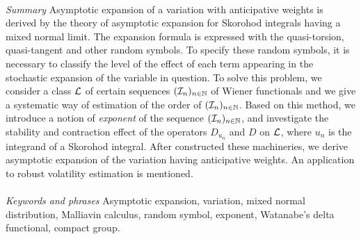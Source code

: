 \documentclass[a4paper,12pt]{article}
\numberwithin{equation}{section}
\numberwithin{equation}{section}
\newcommand{\sred}{\color[rgb]{0.8,0,0}}
\newcommand{\sred}{\color{black}}%
\begin{document}
\maketitle
\ \\
{\it Summary} \hspace{5pt}
Asymptotic expansion of a variation with anticipative weights is derived 
by the theory of asymptotic expansion for Skorohod integrals having a mixed normal limit. 
The expansion formula is expressed with the quasi-torsion, quasi-tangent and other random symbols. 
To specify these random symbols, 
it is necessary to classify the level of the effect of each term appearing in 
the stochastic expansion of the variable in question.  
To solve this problem, we consider a class ${\cal L}$ of certain sequences $({\cal I}_n)_{n\in{\mathbb N}}$ of Wiener functionals 
and we give a systematic way of estimation of the order of $({\cal I}_n)_{n\in{\mathbb N}}$. %
Based on this method, we introduce a notion of {\it exponent} of 
the sequence $({\cal I}_n)_{n\in{\mathbb N}}$, and 
investigate the stability and contraction effect of the operators $D_{u_n}$ and $D$ on ${\cal L}$, 
{\sred where $u_n$ is the integrand of a Skorohod integral.} 
After constructed these machineries, we derive asymptotic expansion of the variation having 
anticipative weights. An application to robust volatility estimation is mentioned. 
\ \\
\ \\
{\it Keywords and phrases} 
Asymptotic expansion, variation, mixed normal distribution, 
Malliavin calculus, random symbol, exponent, 
Watanabe's delta functional, compact group. 
\ \\


\end{document}
